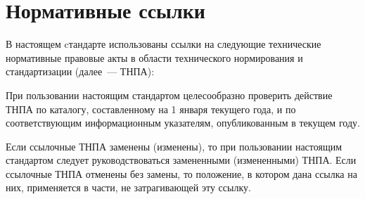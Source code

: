 \chapter{Нормативные ссылки}\label{Refs}

В настоящем cтандарте использованы ссылки на следующие 
технические нормативные правовые акты в области 
технического нормирования и стандартизации (далее~--- ТНПА):



\begin{remark}
При пользовании настоящим стандартом целесообразно 
проверить действие ТНПА по каталогу,
составленному на 1 января текущего года, и по соответствующим 
информационным указателям, опубликованным в текущем году.

Если ссылочные ТНПА заменены (изменены), то при пользовании настоящим 
стандартом следует руководствоваться замененными (измененными) ТНПА. 
Если ссылочные ТНПА отменены без замены, то положение, в котором 
дана ссылка на них, применяется в части, не затрагивающей эту ссылку.
\end{remark}


